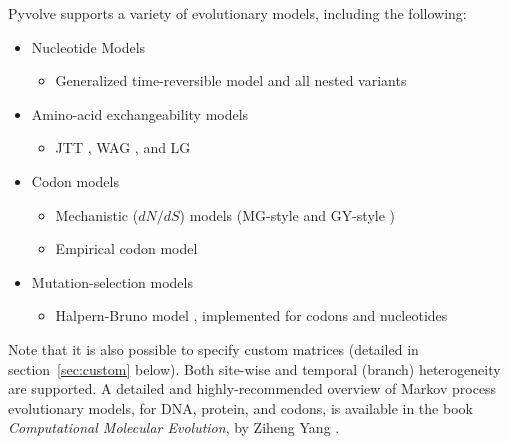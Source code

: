 \documentclass{article}
\begin{document}
Pyvolve supports a variety of evolutionary models, including the following:
\begin{itemize}
	\item Nucleotide Models 
	\begin{itemize}
		\item Generalized time-reversible model \cite{GTR} and all nested variants
	\end{itemize}
	\item Amino-acid exchangeability models 
	\begin{itemize}
		\item JTT \cite{JTT}, WAG \cite{WAG}, and LG \cite{LG}
	\end{itemize}
	\item Codon models
	\begin{itemize}
		\item Mechanistic ($dN/dS$) models (MG-style \cite{MG94} and GY-style \cite{GY94})
		\item Empirical codon model \cite{ECM}
	\end{itemize}
	\item Mutation-selection models
	\begin{itemize}
		\item Halpern-Bruno model \cite{HB98}, implemented for codons and nucleotides
	\end{itemize}
\end{itemize}
Note that it is also possible to specify custom matrices (detailed in section~\ref{sec:custom} below). Both site-wise and temporal (branch) heterogeneity are supported. A detailed and highly-recommended overview of Markov process evolutionary models, for DNA, protein, and codons, is available in the book \emph{Computational Molecular Evolution}, by Ziheng Yang \citep{Yang2006}.
\end{document}
